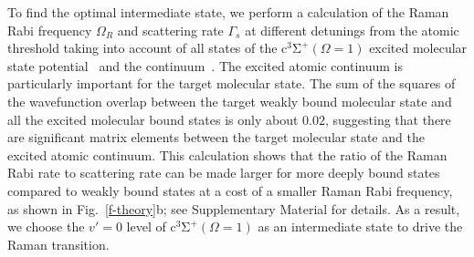 \documentclass[aps,prl,twocolumn,10pt,superscriptaddress]{revtex4-1}
\begin{document}
To find the optimal intermediate state, we perform a calculation of the Raman Rabi frequency $\Omega_R$
and scattering rate $\Gamma_s$ at different detunings from the atomic threshold
taking into account of all states of
the $\mathrm{c^3\Sigma^+}(\Omega = 1)$ excited molecular state potential~\cite{Grochola2011}
and the continuum~\cite{Liu2017}.
The excited atomic continuum is particularly important for the target molecular state.
The sum of the squares of the wavefunction overlap
between the target weakly bound molecular state
and all the excited molecular bound states is only about $0.02$,
suggesting that there are significant matrix elements
between the target molecular state and the excited atomic continuum.
This calculation shows that the ratio of the Raman Rabi rate to scattering rate
can be made larger for more deeply bound states compared to weakly bound states
at a cost of a smaller Raman Rabi frequency, as shown in Fig.~\ref{f-theory}b;
see Supplementary Material for details.
As a result, we choose the $v'=0$ level of $\mathrm{c^3\Sigma^+}(\Omega = 1)$
as an intermediate state to drive the Raman transition.
\end{document}
